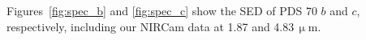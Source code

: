 \documentclass[longauth]{aa}
\newcommand{\vc}[1]{#1}
\begin{document}

Figures~\ref{fig:spec_b} and \ref{fig:spec_c} show the %
SED of PDS 70 $b$ and $c$, respectively, including our NIRCam data at 1.87 and 4.83\,$\upmu$m. 
\end{document}
